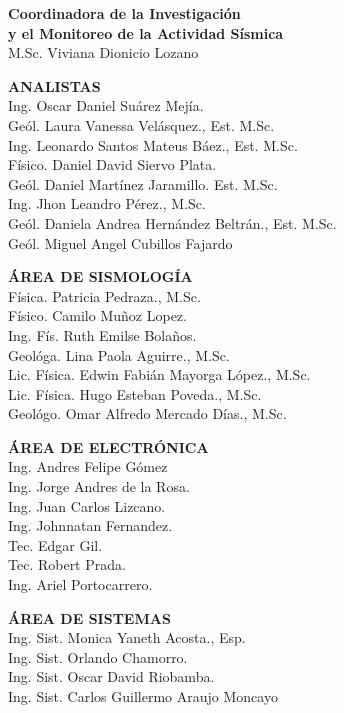 \begin{multicols}{2}
\begin{flushleft}

{\bf \sffamily\textcolor{ocre}{Coordinadora  de la Investigación}} \\ 
{\bf \sffamily\textcolor{ocre}{y el Monitoreo de la Actividad Sísmica}} \\ 
M.Sc. Viviana Dionicio Lozano\\
\vspace{0.4cm}


{\bf \sffamily\textcolor{ocre}{ANALISTAS}}\\ 
Ing. Oscar Daniel Suárez Mejía. \\
Geól. Laura Vanessa Velásquez., Est. M.Sc. \\
Ing. Leonardo Santos Mateus Báez., Est. M.Sc. \\
Físico. Daniel David Siervo Plata. \\
Geól. Daniel Martínez Jaramillo. Est. M.Sc.\\
Ing. Jhon Leandro Pérez., M.Sc. \\
Geól. Daniela Andrea Hernández Beltrán., Est. M.Sc.\\
Geól. Miguel Angel Cubillos Fajardo \\
\vspace{0.4cm}

{\bf \sffamily\textcolor{ocre}{ÁREA DE SISMOLOGÍA}}\\ 
Física. Patricia Pedraza., M.Sc. \\
Físico. Camilo Muñoz Lopez. \\
Ing. Fís. Ruth Emilse Bolaños.\\
Geológa. Lina Paola Aguirre., M.Sc. \\
Lic. Física. Edwin Fabián Mayorga López., M.Sc.\\
Lic. Física. Hugo Esteban Poveda., M.Sc.\\
Geológo. Omar Alfredo Mercado Días., M.Sc.\\
\vspace{0.4cm}

{\bf \sffamily\textcolor{ocre}{ÁREA DE ELECTRÓNICA}}\\
Ing. Andres Felipe Gómez\\
Ing. Jorge Andres de la Rosa.\\
Ing. Juan Carlos Lizcano.\\
Ing. Johnnatan Fernandez.\\ 
Tec. Edgar Gil.\\
Tec. Robert Prada.\\
Ing. Ariel Portocarrero.\\
\vspace{0.4cm}

{\bf \sffamily\textcolor{ocre}{ÁREA DE SISTEMAS}}\\  
Ing. Sist. Monica Yaneth Acosta., Esp.\\
Ing. Sist. Orlando Chamorro. \\
Ing. Sist. Oscar David Riobamba. \\
Ing. Sist. Carlos Guillermo Araujo Moncayo \\
\end{flushleft}
\end{multicols}
